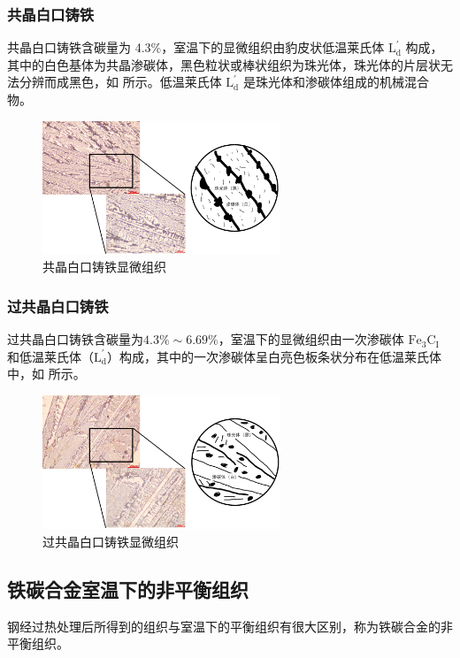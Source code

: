 \documentclass[a4paper,utf8]{article}
\begin{document}
        \subsubsection{共晶白口铸铁}
            共晶白口铸铁含碳量为 4.3\%，室温下的显微组织由豹皮状低温莱氏体 $\text{L}_\text{d}^{'}$ 构成，其中的白色基体为共晶渗碳体，黑色粒状或棒状组织为珠光体，珠光体的片层状无法分辨而成黑色，如 所示。低温莱氏体 $\text{L}_\text{d}^{'}$ 是珠光体和渗碳体组成的机械混合物。
            \begin{figure}[!ht]
                \includegraphics[height=40mm]{result/6.pdf}
                \caption{共晶白口铸铁显微组织\label{fig:6}}
            \end{figure}

        \subsubsection{过共晶白口铸铁}
            过共晶白口铸铁含碳量为$4.3\%\sim 6.69\%$，室温下的显微组织由一次渗碳体 $\text{Fe}_3\text{C}_\text{I}$ 和低温莱氏体（$\text{L}_\text{d}^{'}$）构成，其中的一次渗碳体呈白亮色板条状分布在低温莱氏体中，如 所示。
            \begin{figure}[!ht]
                \includegraphics[height=40mm]{result/7.pdf}
                \caption{过共晶白口铸铁显微组织\label{fig:7}}
            \end{figure}
            \newpage
    \subsection{铁碳合金室温下的非平衡组织}
        钢经过热处理后所得到的组织与室温下的平衡组织有很大区别，称为铁碳合金的非平衡组织。\par
\end{document}
